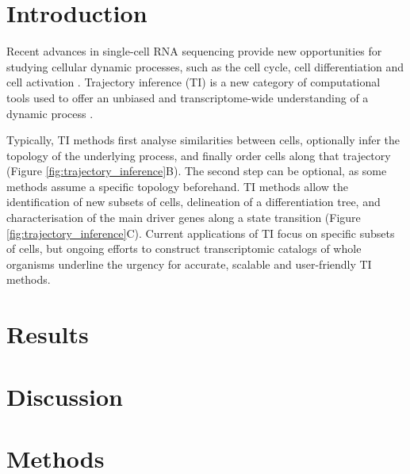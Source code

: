 \section{Introduction}
Recent advances in single-cell RNA sequencing provide new opportunities for studying cellular dynamic processes, such as the cell cycle, cell differentiation and cell activation \cite{tanay_scalingsinglecellgenomics_2017,etzrodt_quantitativesinglecellapproaches_2014}. 
Trajectory inference (TI) is a new category of computational tools used to offer an unbiased and transcriptome-wide understanding of a dynamic process \cite{tanay_scalingsinglecellgenomics_2017,cannoodt_computationalmethodstrajectory_2016}. 


Typically, TI methods first analyse similarities between cells, optionally infer the topology of the underlying process, and finally order cells along that trajectory (Figure \ref{fig:trajectory_inference}B). The second step can be optional, as some methods assume a specific topology beforehand.
TI methods allow the identification of new subsets of cells, delineation of a differentiation tree, and characterisation of the main driver genes along a state transition (Figure \ref{fig:trajectory_inference}C). Current applications of TI focus on specific subsets of cells, but ongoing efforts to construct transcriptomic catalogs of whole organisms \cite{regev_humancellatlas_2017,han_mappingmousecell_2018,schaum_singlecelltranscriptomics20_2018} underline the urgency for accurate, scalable \cite{aibar_scenicsinglecellregulatory_2017,angerer_singlecellsmake_2017} and user-friendly TI methods.






\section{Results}

\section{Discussion}

\section{Methods}